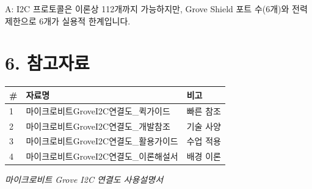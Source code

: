\documentclass[11pt,a4paper]{article}
\begin{document}
A: I2C 프로토콜은 이론상 112개까지 가능하지만, Grove Shield 포트 수(6개)와 전력 제한으로 6개가 실용적 한계입니다.



\section*{6. 참고자료}

\begin{center}
\renewcommand{\arraystretch}{1.4}
\begin{tabular}{|p{1.5cm}|p{10.7cm}|p{2.8cm}|}
\hline
\rowcolor{tableheader}
\textbf{\#} & \textbf{자료명} & \textbf{비고} \\
\hline
1 & 마이크로비트GroveI2C연결도\_퀵가이드 & 빠른 참조 \\
\hline
2 & 마이크로비트GroveI2C연결도\_개발참조 & 기술 사양 \\
\hline
3 & 마이크로비트GroveI2C연결도\_활용가이드 & 수업 적용 \\
\hline
4 & 마이크로비트GroveI2C연결도\_이론해설서 & 배경 이론 \\
\hline
\end{tabular}
\end{center}


\vfill
\begin{center}
\small\color{lightbrown}
\textit{마이크로비트 Grove I2C 연결도 사용설명서}
\end{center}
\end{document}
